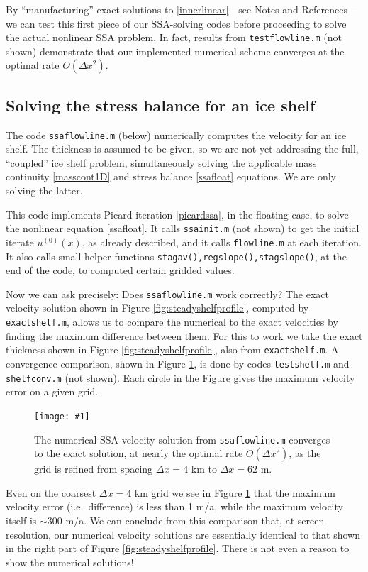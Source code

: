 \documentclass[letterpaper,final,12pt,reqno]{amsart}
\newcommand{\minput}[1]{
\vspace{0.8cm}
\VerbatimInput[frame=single,framesep=3mm,label=\fbox{\normalsize \textsl{\,#1.m\,}},fontfamily=courier,fontsize=\footnotesize]{tmp/#1.slim.m}
\vspace{0.5cm}
}
\newcommand{\onefigsize}[3]{
\begin{figure}[ht]
\centering
\texttt{[image: \#1]}
\caption{#2}
\label{fig:#1}
\end{figure}}
\newcommand{\onefig}[2]{\onefigsize{#1}{#2}{3.0in}}
\begin{document}
\minput{flowline}

By ``manufacturing'' exact solutions to \eqref{innerlinear}---see Notes and References---we can test this first piece of our SSA-solving codes before proceeding to solve the actual nonlinear SSA problem.   In fact, results from \texttt{testflowline.m} (not shown) demonstrate that our implemented numerical scheme converges at the optimal rate $O(\Delta x^2)$.

\subsection*{Solving the stress balance for an ice shelf}  The code \texttt{ssaflowline.m} (below) numerically computes the velocity for an ice shelf.  The thickness is assumed to be given, so we are not yet addressing the full, ``coupled'' ice shelf problem, simultaneously solving the applicable mass continuity \eqref{masscont1D} and stress balance \eqref{ssafloat} equations.  We are only solving the latter.

This code implements Picard iteration \eqref{picardssa}, in the floating case, to solve the nonlinear equation \eqref{ssafloat}.  It calls \texttt{ssainit.m} (not shown) to get the initial iterate $u^{(0)}(x)$, as already described, and it calls \texttt{flowline.m} at each iteration.  It also calls small helper functions \texttt{stagav(),regslope(),stagslope()}, at the end of the code, to computed certain gridded values.

\minput{ssaflowline}

Now we can ask precisely: Does \texttt{ssaflowline.m} work correctly?  The exact velocity solution shown in Figure \ref{fig:steadyshelfprofile}, computed by \texttt{exactshelf.m}, allows us to compare the numerical to the exact velocities by finding the maximum difference between them.  For this to work we take the exact thickness shown in Figure \ref{fig:steadyshelfprofile}, also from \texttt{exactshelf.m}.  A convergence comparison, shown in Figure \ref{fig:shelfconv}, is done by codes \texttt{testshelf.m} and \texttt{shelfconv.m} (not shown).  Each circle in the Figure gives the maximum velocity error on a given grid.

\onefig{shelfconv}{The numerical SSA velocity solution from \texttt{ssaflowline.m} converges to the exact solution, at nearly the optimal rate $O(\Delta x^2)$, as the grid is refined from spacing $\Delta x=4$ km to $\Delta x=62$ m.}

Even on the coarsest $\Delta x = 4$ km grid we see in Figure \ref{fig:shelfconv} that the maximum velocity error (i.e.~difference) is less than 1 m/a, while the maximum velocity itself is $\sim 300$ m/a.  We can conclude from this comparison that, at screen resolution, our numerical velocity solutions are essentially identical to that shown in the right part of Figure \ref{fig:steadyshelfprofile}.  There is not even a reason to show the numerical solutions!
\end{document}
